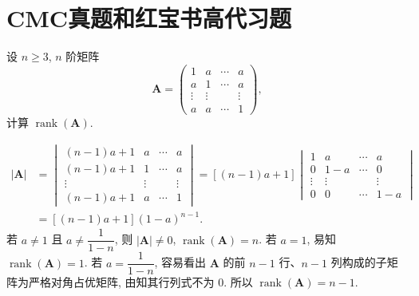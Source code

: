 \documentclass[../../main.tex]{subfiles}
\begin{document}
\section{CMC真题和红宝书高代习题}

\begin{example}
设 \(n \geqslant 3\), \(n\) 阶矩阵
\[
\boldsymbol{A} = \begin{pmatrix} 1 & a & \cdots & a \\ a & 1 & \cdots & a \\ \vdots & \vdots & & \vdots \\ a & a & \cdots & 1 \end{pmatrix},
\]
计算 \(\operatorname{rank}(\boldsymbol{A})\).
\end{example}
\begin{solution}
\[
\begin{aligned}
|\boldsymbol{A}| &= \begin{vmatrix} (n - 1)a + 1 & a & \cdots & a \\ (n - 1)a + 1 & 1 & \cdots & a \\ \vdots & \vdots & & \vdots \\ (n - 1)a + 1 & a & \cdots & 1 \end{vmatrix} = [(n - 1)a + 1] \begin{vmatrix} 1 & a & \cdots & a \\ 0 & 1 - a & \cdots & 0 \\ \vdots & \vdots & & \vdots \\ 0 & 0 & \cdots & 1 - a \end{vmatrix} \\
&= [(n - 1)a + 1](1 - a)^{n - 1}.
\end{aligned}
\]
若 \(a \neq 1\) 且 \(a \neq \dfrac{1}{1 - n}\), 则 \(|\boldsymbol{A}| \neq 0\), \(\operatorname{rank}(\boldsymbol{A}) = n\). 若 \(a = 1\), 易知 \(\operatorname{rank}(\boldsymbol{A}) = 1\). 若 \(a = \dfrac{1}{1 - n}\), 容易看出 \(\boldsymbol{A}\) 的前 \(n - 1\) 行、\(n - 1\) 列构成的子矩阵为严格对角占优矩阵, 由知其行列式不为 0. 所以 \(\operatorname{rank}(\boldsymbol{A}) = n - 1\).

\end{solution}
\end{document}
